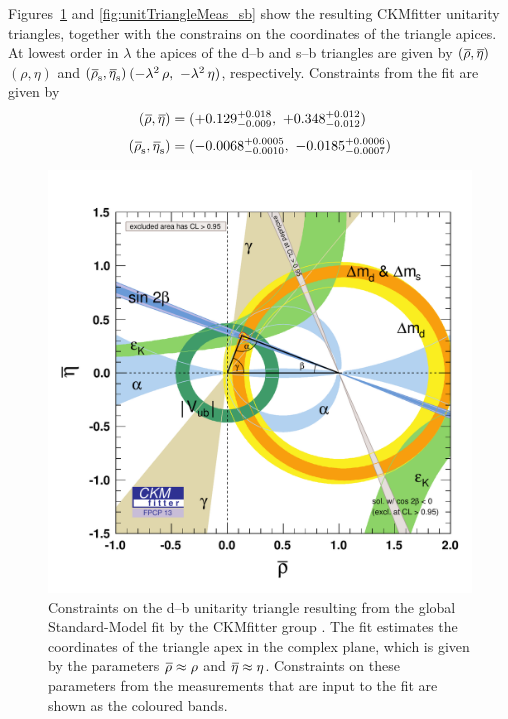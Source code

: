 Figures~\ref{fig:unitTriangleMeas_db} and \ref{fig:unitTriangleMeas_sb} show the resulting CKMfitter unitarity triangles, together with the
constrains on the coordinates of the triangle apices. At lowest order in $\lambda$ the apices of the d--b and s--b triangles are given by
$(\rhobar, \etabar)$\textapprox$(\rho, \eta)$ and $(\rhosbar, \etasbar)$\textapprox$(-\lambda^2\,\rho,\ -\lambda^2\,\eta)$, respectively.
Constraints from the fit are given by
\begin{equation}
  \label{eq:CKMApicesCKMf}
  \begin{aligned}
    (\rhobar, \etabar)   &= (+0.129^{+0.018}_{-0.009},\ +0.348^{+0.012}_{-0.012}) \\[0.3em]
    (\rhosbar, \etasbar) &= (-0.0068^{+0.0005}_{-0.0010},\ -0.0185^{+0.0006}_{-0.0007})
  \end{aligned}
\end{equation}

\begin{figure}[htbp]
  \centering
  \includegraphics[trim=5mm 2mm 3mm 15mm, clip=true, width=\textwidth]{graphics/intro/rhoeta_large_CMYK}
  \caption{Constraints on the d--b unitarity triangle resulting from the global Standard-Model fit by the CKMfitter group
           \cite{Charles:2004jd}. The fit estimates the coordinates of the triangle apex in the complex plane, which is given by the
	   parameters $\rhobar\approx\rho$ and $\etabar\approx\eta$.
           Constraints on these parameters from the measurements that are input to the fit are shown as the coloured bands.}
  \label{fig:unitTriangleMeas_db}
\end{figure}

